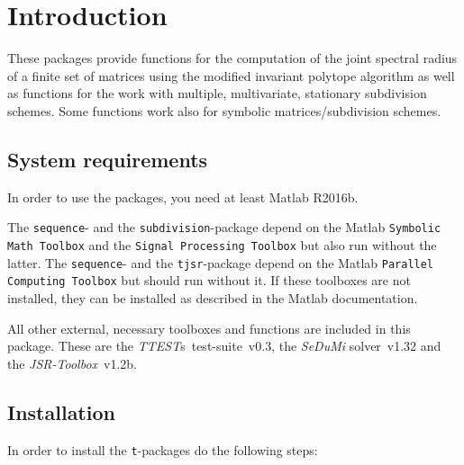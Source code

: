 

\chapter{Introduction}
These packages provide functions for the computation of the joint spectral radius of a finite set of matrices using the modified invariant polytope algorithm
as well as functions for the work with multiple, multivariate, stationary subdivision schemes.
Some functions work also for symbolic matrices/subdivision schemes.

\section{System requirements}

In order to use the packages, you need at least Matlab R2016b.

The \texttt{sequence}- and the \texttt{subdivision}-package depend on the Matlab \texttt{Symbolic Math Toolbox} and the  
\texttt{Signal Processing Toolbox} but also run without the latter.
The \texttt{sequence}- and the \texttt{tjsr}-package depend on the Matlab \texttt{Parallel Computing Toolbox} but should run without it.
If these toolboxes are not installed, they can be installed as described in the Matlab documentation.

All other external, necessary toolboxes and functions are included in this package. These are
the \emph{TTEST}s~test-suite~v0.3, the \emph{SeDuMi} solver~v1.32 and the \emph{JSR-Toolbox}~v1.2b.

\section{Installation}
In order to install the \texttt{t}-packages do the following steps:

